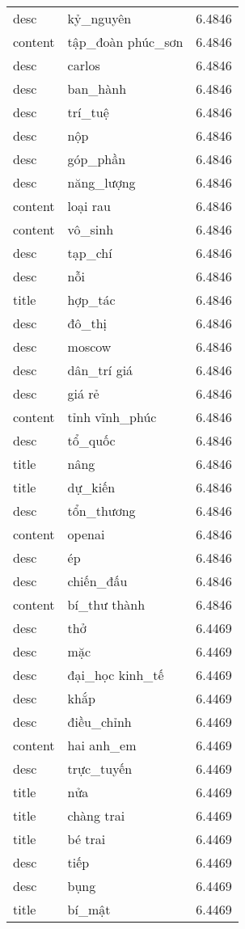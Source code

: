 \documentclass{article}
\begin{document}
\begin{tabular}{lll}
desc & kỷ\_nguyên & 6.4846\\
content & tập\_đoàn phúc\_sơn & 6.4846\\
desc & carlos & 6.4846\\
desc & ban\_hành & 6.4846\\
desc & trí\_tuệ & 6.4846\\
desc & nộp & 6.4846\\
desc & góp\_phần & 6.4846\\
desc & năng\_lượng & 6.4846\\
content & loại rau & 6.4846\\
content & vô\_sinh & 6.4846\\
desc & tạp\_chí & 6.4846\\
desc & nỗi & 6.4846\\
title & hợp\_tác & 6.4846\\
desc & đô\_thị & 6.4846\\
desc & moscow & 6.4846\\
desc & dân\_trí giá & 6.4846\\
desc & giá rẻ & 6.4846\\
content & tỉnh vĩnh\_phúc & 6.4846\\
desc & tổ\_quốc & 6.4846\\
title & nâng & 6.4846\\
title & dự\_kiến & 6.4846\\
desc & tổn\_thương & 6.4846\\
content & openai & 6.4846\\
desc & ép & 6.4846\\
desc & chiến\_đấu & 6.4846\\
content & bí\_thư thành & 6.4846\\
desc & thở & 6.4469\\
desc & mặc & 6.4469\\
desc & đại\_học kinh\_tế & 6.4469\\
desc & khắp & 6.4469\\
desc & điều\_chỉnh & 6.4469\\
content & hai anh\_em & 6.4469\\
desc & trực\_tuyến & 6.4469\\
title & nửa & 6.4469\\
title & chàng trai & 6.4469\\
title & bé trai & 6.4469\\
desc & tiếp & 6.4469\\
desc & bụng & 6.4469\\
title & bí\_mật & 6.4469\\

\end{tabular}
\end{document}
